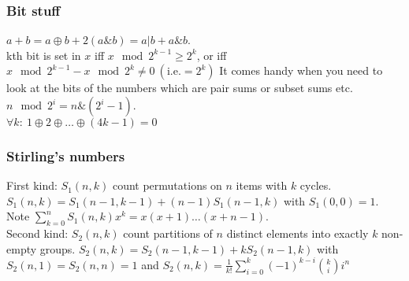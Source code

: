 \documentclass[
	a4paper,
	landscape,
	10pt,
]{article}
\begin{document}
		\subsubsection*{Bit stuff} $a + b = a \oplus b + 2(a\&b) = a | b + a\&b$. \\
		kth bit is set in $x$ iff $x \mod 2^{k-1} \geq 2^k$, or iff $x \mod 2^{k-1}  - x \mod 2^k \neq 0~(\text{i.e.} = 2^k)$ It comes handy when you need to look at the bits of the numbers which are pair sums or subset sums etc. \\
		$n \mod 2^i = n\&(2^i-1)$. \\
		$\forall k:~ 1 \oplus 2 \oplus \hdots \oplus (4k-1) = 0$

		\subsubsection*{Stirling's numbers} First kind: $S_1(n, k)$ count permutations on $n$ items
		with $k$ cycles. $S_1(n, k) = S_1(n-1, k-1) + (n-1)S_1(n-1, k)$ with
		$S_1(0, 0) = 1$. Note $\sum_{k=0}^n S_1(n, k)x^k = x(x+1)\dots(x+n-1)$.\\
		Second kind: $S_2(n, k)$ count partitions of $n$
		distinct elements into exactly $k$ non-empty groups.
		$S_2(n, k) = S_2(n-1, k-1) + kS_2(n-1, k)$ with $S_2(n, 1) = S_2(n, n) = 1$ and
		$S_2(n, k) = \frac{1}{k!}\sum_{i=0}^k (-1)^{k-i}\binom{k}{i}i^n$
\end{document}
